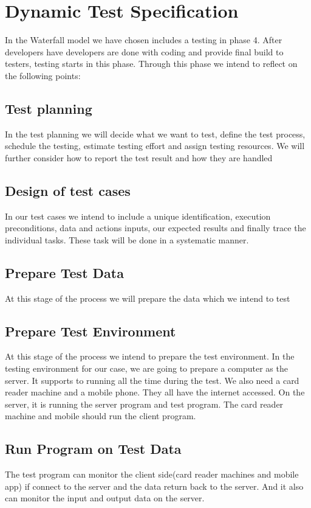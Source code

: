 \section*{Dynamic Test Specification}

In the Waterfall model we have chosen includes a testing in phase 4. After developers have developers are done with coding and provide final build to testers, testing starts in this phase. Through this phase we intend to reflect on the following points:

\subsection*{Test planning}
In the test planning we will decide what we want to test, define the test process, schedule the testing, estimate testing effort and assign testing resources. We will further consider how to report the test result and how they are handled

\subsection*{Design of test cases}
In our test cases we intend to include a unique identification, execution preconditions, data and actions inputs, our expected results and finally trace the individual tasks. These task will be done in a systematic manner.

\subsection*{Prepare Test Data}
At this stage of the process we will prepare the data which we intend to test

\subsection*{Prepare Test Environment}
At this stage of the process we intend to prepare the test environment. In the testing environment for our case, we are going to prepare a computer as the server. It supports to running all the time during the test. We also need a card reader machine and a mobile phone. They all have the internet accessed. 
On the server, it is running the server program and test program. The card reader machine and mobile should run the client program.

\subsection*{Run Program on Test Data}
The test program can monitor the client side(card reader machines and mobile app) if connect to the server and the data return back to the server. And it also can monitor the input and output data on the server.

